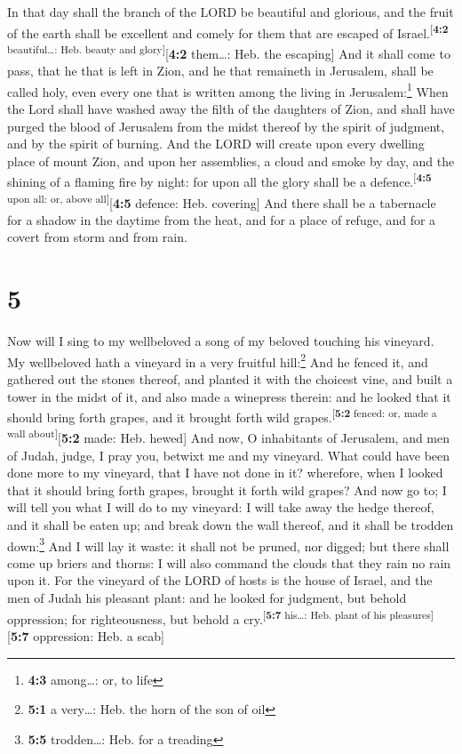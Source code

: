  In that day shall the branch of the LORD be beautiful and
glorious, and the fruit of the earth shall be excellent and comely for
them that are escaped of Israel.\textsuperscript{{[}\textbf{4:2}
beautiful\ldots: Heb. beauty and glory{]}}{[}\textbf{4:2} them\ldots:
Heb. the escaping{]}  And it shall come to pass, that he
that is left in Zion, and he that remaineth in Jerusalem, shall be
called holy, even every one that is written among the living in
Jerusalem:\footnote{\textbf{4:3} among\ldots: or, to life}
 When the Lord shall have washed away the filth of the
daughters of Zion, and shall have purged the blood of Jerusalem from the
midst thereof by the spirit of judgment, and by the spirit of burning.
 And the LORD will create upon every dwelling place of
mount Zion, and upon her assemblies, a cloud and smoke by day, and the
shining of a flaming fire by night: for upon all the glory shall be a
defence.\textsuperscript{{[}\textbf{4:5} upon all: or, above
all{]}}{[}\textbf{4:5} defence: Heb. covering{]}  And
there shall be a tabernacle for a shadow in the daytime from the heat,
and for a place of refuge, and for a covert from storm and from rain.

\hypertarget{section-4}{%
\section{5}\label{section-4}}

 Now will I sing to my wellbeloved a song of my beloved
touching his vineyard. My wellbeloved hath a vineyard in a very fruitful
hill:\footnote{\textbf{5:1} a very\ldots: Heb. the horn of the son of
  oil}  And he fenced it, and gathered out the stones
thereof, and planted it with the choicest vine, and built a tower in the
midst of it, and also made a winepress therein: and he looked that it
should bring forth grapes, and it brought forth wild
grapes.\textsuperscript{{[}\textbf{5:2} fenced: or, made a wall
about{]}}{[}\textbf{5:2} made: Heb. hewed{]}  And now, O
inhabitants of Jerusalem, and men of Judah, judge, I pray you, betwixt
me and my vineyard.  What could have been done more to my
vineyard, that I have not done in it? wherefore, when I looked that it
should bring forth grapes, brought it forth wild grapes? 
And now go to; I will tell you what I will do to my vineyard: I will
take away the hedge thereof, and it shall be eaten up; and break down
the wall thereof, and it shall be trodden down:\footnote{\textbf{5:5}
  trodden\ldots: Heb. for a treading}  And I will lay it
waste: it shall not be pruned, nor digged; but there shall come up
briers and thorns: I will also command the clouds that they rain no rain
upon it.  For the vineyard of the LORD of hosts is the
house of Israel, and the men of Judah his pleasant plant: and he looked
for judgment, but behold oppression; for righteousness, but behold a
cry.\textsuperscript{{[}\textbf{5:7} his\ldots: Heb. plant of his
pleasures{]}}{[}\textbf{5:7} oppression: Heb. a scab{]}

